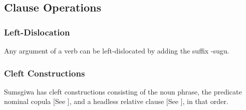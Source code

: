 \subsection{Clause Operations}

\subsubsection{Left-Dislocation}
Any argument of a verb can be left-dislocated by adding the suffix -\textlangle sugu\textrangle.

\subsubsection{Cleft Constructions}
Sumsgiwa has cleft constructions consisting of the noun phrase, the predicate nominal copula [See ], and a headless relative clause [See ], in that order.
